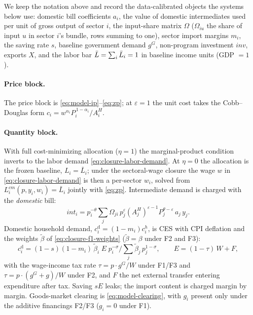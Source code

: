 We keep the notation above and record the data-calibrated objects the
systems below use: domestic bill coefficients $a_i$, the value of domestic
intermediates used per unit of gross output of sector $i$, the input-share matrix $\Omega$ ($\Omega_{iu}$ the share of input $u$ in
sector $i$'s bundle, rows summing to one), sector import margins $m_i$, the
saving rate $s$, baseline government demand $g^G$, non-program investment
$inv$, exports $X$, and the labor bar $\bar{L} = \sum_i \bar L_i = 1$ in
baseline income units (GDP $=1$).

\paragraph{Price block.} The price block is \eqref{eq:model-ip}--\eqref{eq:zp}; at
$\varepsilon = 1$ the unit cost takes the Cobb--Douglas form
$c_i = w^{\alpha_i} P_i^{\,1-\alpha_i}/A_i^{H}$.

\paragraph{Quantity block.} With full cost-minimizing allocation
($\eta = 1$) the marginal-product condition inverts to the labor demand
\eqref{eq:closure-labor-demand}. At $\eta = 0$ the allocation is the
frozen baseline, $L_i = \bar{L}_i$; under the sectoral-wage closure the wage
$w$ in \eqref{eq:closure-labor-demand} is then a per-sector $w_i$, solved from
$L^{cm}_i(p, y_i, w_i) = \bar{L}_i$ jointly with \eqref{eq:zp}.
Intermediate demand is charged with the \emph{domestic}
bill:
\begin{equation}
int_i = p_i^{-\theta} \sum_j \Omega_{ji}\,
        p_j^{\varepsilon} (A_j^{H})^{\varepsilon-1} P_j^{\theta-\varepsilon}\, a_j\, y_j.
\label{eq:int}
\end{equation}
Domestic household demand, $c_i^{\mathrm{d}}=(1-m_i)c_i^h$, is CES with CPI
deflation and the weights $\widetilde{\beta}$ of \eqref{eq:closure-f1-weights}
($\widetilde{\beta} = \beta$ under F2 and F3):
\begin{equation}
c_i^{\mathrm{d}} = (1-s)(1-m_i)\,\widetilde{\beta}_i\; E\; p_i^{-\sigma} \Big/
      \textstyle\sum_j \widetilde{\beta}_j\, p_j^{1-\sigma},
\qquad
E = (1-\tau)\, W + F,
\label{eq:cons}
\end{equation}
with the wage-income tax rate $\tau = p\!\cdot\! g^G / W$ under
F1/F3 and $\tau = p\!\cdot\!(g^G + g)/W$ under F2, and $F$ the
net external transfer entering expenditure after tax. Saving
$sE$ leaks; the import content is charged margin by margin. Goods-market
clearing is \eqref{eq:model-clearing}, with $g_i$ present only under the
additive financings F2/F3 ($g_i = 0$ under F1).


